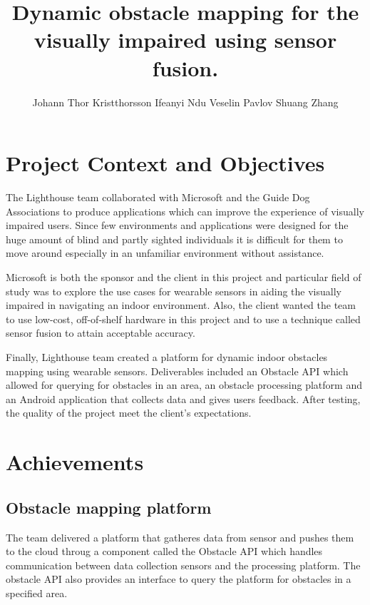 \documentclass[prodmode,acmtosem]{acmsmall} %
\begin{document}

\title{Dynamic obstacle mapping for the visually impaired using sensor fusion.}
\author{Johann Thor Kristthorsson
Ifeanyi Ndu
Veselin Pavlov
Shuang Zhang
}
\maketitle

\section{Project Context and Objectives}
The Lighthouse team collaborated with Microsoft and the Guide Dog Associations to produce applications which can improve the experience of visually impaired users. Since few environments and applications were designed for the huge amount of blind and partly sighted individuals it is difficult for them to move around especially in an unfamiliar environment without assistance. 

Microsoft is both the sponsor and the client in this project and particular field of study was to explore the use cases for wearable sensors in aiding the visually impaired in navigating an indoor environment. Also, the client wanted the team to use low-cost, off-of-shelf hardware in this project and to use a technique called sensor fusion to attain acceptable accuracy.

Finally, Lighthouse team created a platform for dynamic indoor obstacles mapping using wearable sensors. Deliverables included an Obstacle API which allowed for querying for obstacles in an area, an obstacle processing platform and an Android application that collects data and gives users feedback. After testing, the quality of the project meet the client's expectations.

\section{Achievements}
\subsection{Obstacle mapping platform}
The team delivered a platform that gatheres data from sensor and pushes them to the cloud throug a component called the Obstacle API which handles communication between data collection sensors and the processing platform. The obstacle API also provides an interface to query the platform for obstacles in a specified area. 
\end{document}
